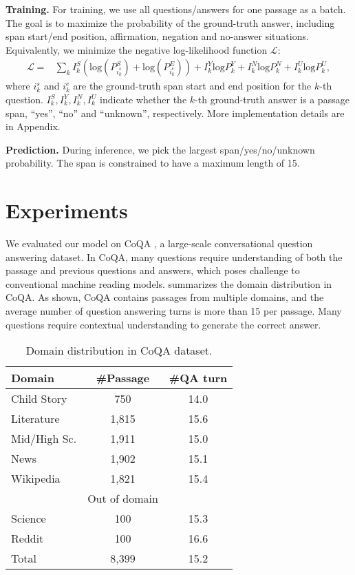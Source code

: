 \documentclass{article} \usepackage{sdnet,times}
\begin{document}
\textbf{Training.} For training, we use all questions/answers for one passage as a batch. The goal is to maximize the probability of the ground-truth answer, including span start/end position, affirmation, negation and no-answer situations. Equivalently, we minimize the negative log-likelihood function $\mathcal{L}$:
\begin{align*}
\mathcal{L} =& \sum_k I^S_k(\mbox{log}(P^S_{i_k^s}) + \mbox{log}(P^E_{i_k^e})) + I^Y_k\mbox{log}P^Y_k+I^N_k\mbox{log}P^N_k + I^U_k\mbox{log}P^U_k,
\end{align*}
where $i_k^s$ and $i_k^e$ are the ground-truth span start and end position for the $k$-th question. $I^S_k, I^Y_k, I^N_k, I^U_k$ indicate whether the $k$-th ground-truth answer is a passage span, ``yes'', ``no'' and ``unknown'', respectively. More implementation details are in Appendix.

\textbf{Prediction.} During inference, we pick the largest span/yes/no/unknown probability. The span is constrained to have a maximum length of 15.

\section{Experiments}
\label{exp}
We evaluated our model on CoQA \citep{coqa}, a large-scale conversational question answering dataset. In CoQA, many questions require understanding of both the passage and previous questions and answers, which poses challenge to conventional machine reading models.  summarizes the domain distribution in CoQA. As shown, CoQA contains passages from multiple domains, and the average number of question answering turns is more than 15 per passage. Many questions require contextual understanding to generate the correct answer.

\begin{table}[t]
\centering
\caption{Domain distribution in CoQA dataset.}\label{table:coqa}
\vspace{-0.5\baselineskip}
\begin{tabular}{lcc}
\toprule
Domain & \#Passage & \#QA turn\\ \midrule
Child Story & 750 & 14.0\\
Literature & 1,815 & 15.6\\
Mid/High Sc. & 1,911 & 15.0\\
News & 1,902 & 15.1\\
Wikipedia & 1,821 &  15.4 \\ \midrule 
& Out of domain & \\ \midrule 
Science & 100 &  15.3\\
Reddit & 100 & 16.6\\ \midrule
Total & 8,399 & 15.2\\
\bottomrule

\end{tabular}
\end{table}
\end{document}
